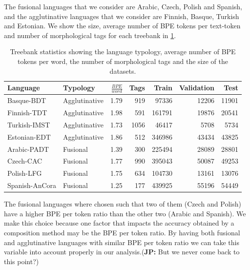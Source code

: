 \documentclass[11pt]{article}
\newcommand\jp[1]{(\textbf{JP:} #1)}
\begin{document}
    
           	The fusional languages that we consider are Arabic, Czech,
     Polish and Spanish, and the agglutinative languages that we
     consider are Finnish, Basque, Turkish and Estonian.  We show the
     size, average number of BPE tokens per text-token and number of
     morphological tags for each treebank in \cref{tab:data}.
    

    
    
    	\begin{table} %
		\centering
		\begin{tabular}{l|lrrrrr}
			Language & Typology & $\frac{BPE}{word}$ & Tags & Train & Validation & Test \\
			\hline
			Basque-BDT      & Agglutinative & 1.79 & 919 & 97336 & 12206 & 11901 \\
			Finnish-TDT     & Agglutinative & 1.98 & 591 & 161791 & 19876 & 20541 \\
			Turkish-IMST    & Agglutinative & 1.73 & 1056 & 46417 & 5708 & 5734 \\
			Estonian-EDT    & Agglutinative & 1.86 & 512 & 346986 & 43434 & 43825 \\
            Arabic-PADT     & Fusional & 1.39 & 300 & 225494 & 28089 & 28801  \\
			Czech-CAC       & Fusional & 1.77 & 990 & 395043 & 50087 & 49253 \\
			Polish-LFG      & Fusional & 1.75 & 634 & 104730 & 13161 & 13076 \\
			Spanish-AnCora  & Fusional & 1.25 & 177 & 439925 & 55196 & 54449 \\
        \end{tabular}
		\caption{\label{tab:data} Treebank statistics showing the language typology, average number of BPE tokens per word, the number of morphological tags and the size of the datasets.}
	\end{table}
    
        The fusional languages where chosen such that two of them
        (Czech and Polish) have a higher BPE per token ratio than the
        other two (Arabic and Spanish). We make this choice because
        one factor that impacts the accuracy obtained by a composition
        method may be the BPE per token ratio.  By having both
        fusional and agglutinative languages with similar BPE per
        token ratio we can take this variable into account properly in
        our analysis.\jp{But we never come back to this point?}
\end{document}
